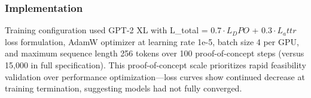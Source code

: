 \subsubsection{Implementation}

Training configuration used GPT-2 XL with L\_total = 0.$7\cdot L_DPO$ + 0.$3\cdot L_attr$ loss formulation, AdamW optimizer at learning rate 1e-5, batch size 4 per GPU, and maximum sequence length 256 tokens over 100 proof-of-concept steps (versus 15,000 in full specification). This proof-of-concept scale prioritizes rapid feasibility validation over performance optimization---loss curves show continued decrease at training termination, suggesting models had not fully converged.
